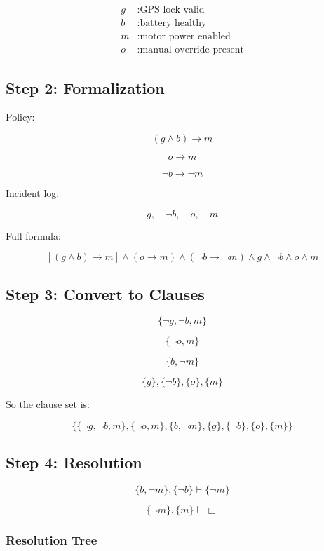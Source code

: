 \documentclass{article}
\theoremstyle{theorem}
\theoremstyle{definition}
\theoremstyle{remark}
\begin{document}
\begin{align*}
g &: \text{GPS lock valid} \\
b &: \text{battery healthy} \\
m &: \text{motor power enabled} \\
o &: \text{manual override present}
\end{align*}

\subsection*{Step 2: Formalization}

Policy:

\[
(g\land b)\to m
\]

\[
o\to m
\]

\[
\neg b \to \neg m
\]

Incident log:

\[
g,\quad \neg b,\quad o,\quad m
\]

Full formula:

\[
[(g\land b)\to m]\land(o\to m)\land(\neg b\to\neg m)\land g\land\neg b\land o\land m
\]

\subsection*{Step 3: Convert to Clauses}

\[
\{\neg g,\neg b,m\}
\]

\[
\{\neg o,m\}
\]

\[
\{b,\neg m\}
\]

\[
\{g\},\{\neg b\},\{o\},\{m\}
\]

So the clause set is:

\[
\{
\{\neg g,\neg b,m\},
\{\neg o,m\},
\{b,\neg m\},
\{g\},
\{\neg b\},
\{o\},
\{m\}
\}
\]

\subsection*{Step 4: Resolution}

\[
\{b,\neg m\},\{\neg b\}\vdash \{\neg m\}
\]

\[
\{\neg m\},\{m\}\vdash \Box
\]

\subsubsection*{Resolution Tree}

\begin{center}
\end{center}
\end{document}
